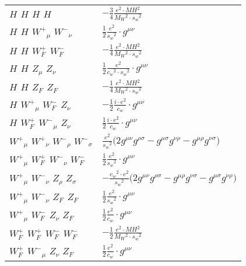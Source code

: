 \begin{center}
\begin{tabular}{|l|l|}
${H}_{}$ \phantom{-} ${H}_{}$ \phantom{-} ${H}_{}$ \phantom{-} ${H}_{}$ \phantom{-}  &
	$-\frac{3}{4}\frac{ e{}^2  \cdot MH{}^2 }{ M_W{}^2  \cdot s_w{}^2 }$\\[2mm]
${H}_{}$ \phantom{-} ${H}_{}$ \phantom{-} $W^+{}_{\mu }$ \phantom{-} $W^-{}_{\nu }$ \phantom{-}  &
	$\frac{1}{2}\frac{ e{}^2 }{ s_w{}^2 }\cdot g^{\mu \nu} $\\[2mm]
${H}_{}$ \phantom{-} ${H}_{}$ \phantom{-} $W^+_F{}_{}$ \phantom{-} $W^-_F{}_{}$ \phantom{-}  &
	$-\frac{1}{4}\frac{ e{}^2  \cdot MH{}^2 }{ M_W{}^2  \cdot s_w{}^2 }$\\[2mm]
${H}_{}$ \phantom{-} ${H}_{}$ \phantom{-} ${Z}_{\mu }$ \phantom{-} ${Z}_{\nu }$ \phantom{-}  &
	$\frac{1}{2}\frac{ e{}^2 }{ c_w{}^2  \cdot s_w{}^2 }\cdot g^{\mu \nu} $\\[2mm]
${H}_{}$ \phantom{-} ${H}_{}$ \phantom{-} $Z_F{}_{}$ \phantom{-} $Z_F{}_{}$ \phantom{-}  &
	$-\frac{1}{4}\frac{ e{}^2  \cdot MH{}^2 }{ M_W{}^2  \cdot s_w{}^2 }$\\[2mm]
${H}_{}$ \phantom{-} $W^+{}_{\mu }$ \phantom{-} $W^-_F{}_{}$ \phantom{-} ${Z}_{\nu }$ \phantom{-}  &
	$-\frac{1}{2}\frac{ i \cdot e{}^2 }{ c_w}\cdot g^{\mu \nu} $\\[2mm]
${H}_{}$ \phantom{-} $W^+_F{}_{}$ \phantom{-} $W^-{}_{\mu }$ \phantom{-} ${Z}_{\nu }$ \phantom{-}  &
	$\frac{1}{2}\frac{ i \cdot e{}^2 }{ c_w}\cdot g^{\mu \nu} $\\[2mm]
$W^+{}_{\mu }$ \phantom{-} $W^+{}_{\nu }$ \phantom{-} $W^-{}_{\rho }$ \phantom{-} $W^-{}_{\sigma }$ \phantom{-}  &
	$\frac{ e{}^2 }{ s_w{}^2 }\big(2g^{\mu \nu} g^{\rho \sigma} -g^{\mu \sigma} g^{\nu \rho} -g^{\mu \rho} g^{\nu \sigma} \big)$\\[2mm]
$W^+{}_{\mu }$ \phantom{-} $W^+_F{}_{}$ \phantom{-} $W^-{}_{\nu }$ \phantom{-} $W^-_F{}_{}$ \phantom{-}  &
	$\frac{1}{2}\frac{ e{}^2 }{ s_w{}^2 }\cdot g^{\mu \nu} $\\[2mm]
$W^+{}_{\mu }$ \phantom{-} $W^-{}_{\nu }$ \phantom{-} ${Z}_{\rho }$ \phantom{-} ${Z}_{\sigma }$ \phantom{-}  &
	$-\frac{ c_w{}^2  \cdot e{}^2 }{ s_w{}^2 }\big(2g^{\mu \nu} g^{\rho \sigma} -g^{\mu \rho} g^{\nu \sigma} -g^{\mu \sigma} g^{\nu \rho} \big)$\\[2mm]
$W^+{}_{\mu }$ \phantom{-} $W^-{}_{\nu }$ \phantom{-} $Z_F{}_{}$ \phantom{-} $Z_F{}_{}$ \phantom{-}  &
	$\frac{1}{2}\frac{ e{}^2 }{ s_w{}^2 }\cdot g^{\mu \nu} $\\[2mm]
$W^+{}_{\mu }$ \phantom{-} $W^-_F{}_{}$ \phantom{-} ${Z}_{\nu }$ \phantom{-} $Z_F{}_{}$ \phantom{-}  &
	$\frac{1}{2}\frac{ e{}^2 }{ c_w}\cdot g^{\mu \nu} $\\[2mm]
$W^+_F{}_{}$ \phantom{-} $W^+_F{}_{}$ \phantom{-} $W^-_F{}_{}$ \phantom{-} $W^-_F{}_{}$ \phantom{-}  &
	$-\frac{1}{2}\frac{ e{}^2  \cdot MH{}^2 }{ M_W{}^2  \cdot s_w{}^2 }$\\[2mm]
$W^+_F{}_{}$ \phantom{-} $W^-{}_{\mu }$ \phantom{-} ${Z}_{\nu }$ \phantom{-} $Z_F{}_{}$ \phantom{-}  &
	$\frac{1}{2}\frac{ e{}^2 }{ c_w}\cdot g^{\mu \nu} $\\ \hline
\end{tabular}


\end{center}
